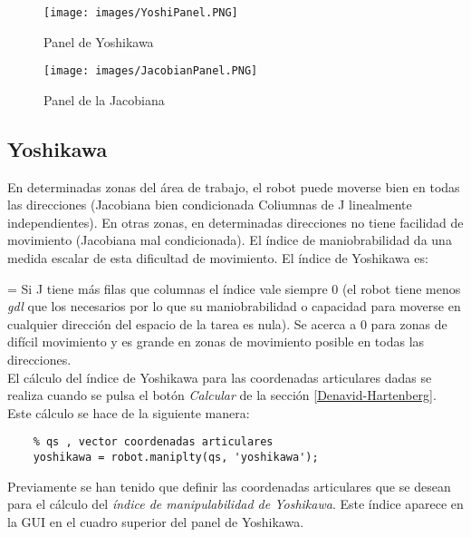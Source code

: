\documentclass[a4paper, fontsize=11pt]{scrartcl} %
\numberwithin{equation}{section} %
\numberwithin{figure}{section} %
\numberwithin{table}{section} %
\newenvironment{myalign}{\par\nobreak\large\noindent\align}{\endalign} %
\begin{document}
	\begin{figure}[h!]
		\centering
		\texttt{[image: images/YoshiPanel.PNG]}
		\caption{Panel de Yoshikawa}
		\label{Yoshi_Panel}
	\end{figure}
	\FloatBarrier
	
	\begin{figure}[h!]
		\centering
		\texttt{[image: images/JacobianPanel.PNG]}
		\caption{Panel de la Jacobiana}
		\label{Jacobian_Panel}
	\end{figure}
	\FloatBarrier
	
	\subsection{Yoshikawa}
	
	En determinadas zonas del área de trabajo, el robot puede moverse bien en todas las direcciones (Jacobiana bien condicionada Coliumnas de J linealmente independientes). En otras zonas, en determinadas direcciones no tiene facilidad de movimiento (Jacobiana mal condicionada). El índice de maniobrabilidad da una medida escalar de esta dificultad de movimiento. El índice de Yoshikawa es:
	
	\begin{myalign}
		\eta = 
	\end{myalign}
	Si J tiene más filas que columnas el índice vale siempre 0 (el robot tiene menos \textit{gdl} que los necesarios por lo que su maniobrabilidad o capacidad para moverse en cualquier dirección del espacio de la tarea es nula). Se acerca a $0$ para zonas de difícil movimiento y es grande en zonas de movimiento posible en todas las direcciones.\\
	
	El cálculo del índice de Yoshikawa para las coordenadas articulares dadas se realiza cuando se pulsa el botón \textit{Calcular} de la sección \ref{Denavid-Hartenberg}. Este cálculo se hace de la siguiente manera:
	
	\begin{lstlisting}
	% qs , vector coordenadas articulares
	yoshikawa = robot.maniplty(qs, 'yoshikawa');
	\end{lstlisting}
	Previamente se han tenido que definir las coordenadas articulares que se desean para el cálculo del \textit{índice de manipulabilidad de Yoshikawa}. Este índice aparece en la GUI en el cuadro superior del panel de Yoshikawa.\\
	
\end{document}
